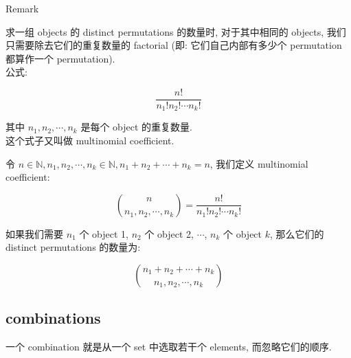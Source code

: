 \begin{qlremark}{Remark}

求一组 objects 的 distinct permutations 的数量时, 对于其中相同的 objects, 我们只需要除去它们的重复数量的 factorial (即: 它们自己内部有多少个 permutation 都算作一个 permutation).\\
公式:

\[\frac{\mathit{n}!}{\mathit{n}_{1}!\mathit{n}_{2}!\cdots\mathit{n}_{\mathit{k}}!}\]

其中 \(\mathit{n}_{1},\mathit{n}_{2},\cdots,\mathit{n}_{\mathit{k}}\) 是每个 object 的重复数量.\\
这个式子又叫做 multinomial coefficient.

\begin{definition}{}

令 \(\mathit{n} \in \mathbb{N},\mathit{n}_{1},\mathit{n}_{2},\cdots,\mathit{n}_{\mathit{k}} \in \mathbb{N},\mathit{n}_{1} + \mathit{n}_{2} + \cdots + \mathit{n}_{\mathit{k}} = \mathit{n}\), 我们定义 multinomial coefficient:

\[\binom{\mathit{n}}{\mathit{n}_{1},\mathit{n}_{2},\cdots,\mathit{n}_{\mathit{k}}} = \frac{\mathit{n}!}{\mathit{n}_{1}!\mathit{n}_{2}!\cdots\mathit{n}_{\mathit{k}}!}\]

\end{definition}

\begin{proposition}

如果我们需要 \(\mathit{n}_{1}\) 个 object 1, \(\mathit{n}_{2}\) 个 object 2, \(\cdots\), \(\mathit{n}_{\mathit{k}}\) 个 object \(\mathit{k}\), 那么它们的 distinct permutations 的数量为:

\[\binom{\mathit{n}_{1} + \mathit{n}_{2} + \cdots + \mathit{n}_{\mathit{k}}}{\mathit{n}_{1},\mathit{n}_{2},\cdots,\mathit{n}_{\mathit{k}}}\]

\end{proposition}

\end{qlremark}

\subsection{combinations}\label{combinations}

\begin{definition}{}

一个 combination 就是从一个 set 中选取若干个 elements, 而忽略它们的顺序.

\end{definition}

